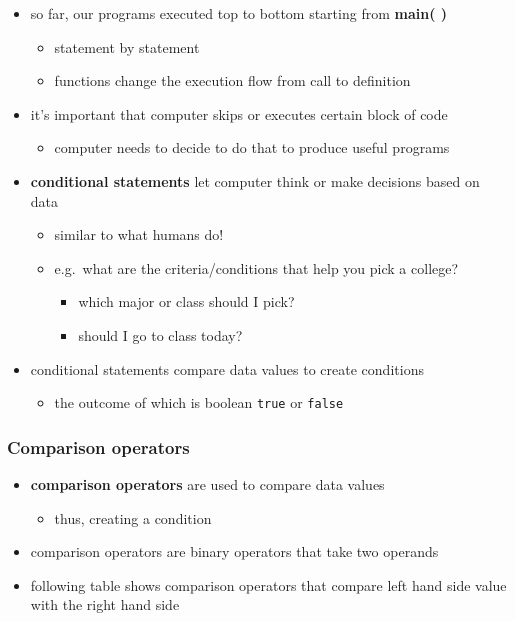\documentclass[11pt]{article}
\providecommand{\tightlist}{%
      \setlength{\itemsep}{0pt}\setlength{\parskip}{0pt}}
\begin{document}
\begin{itemize}
\tightlist
\item
  so far, our programs executed top to bottom starting from
  \textbf{main( )}

  \begin{itemize}
  \tightlist
  \item
    statement by statement
  \item
    functions change the execution flow from call to definition
  \end{itemize}
\item
  it's important that computer skips or executes certain block of code

  \begin{itemize}
  \tightlist
  \item
    computer needs to decide to do that to produce useful programs
  \end{itemize}
\item
  \textbf{conditional statements} let computer think or make decisions
  based on data

  \begin{itemize}
  \tightlist
  \item
    similar to what humans do!
  \item
    e.g.~what are the criteria/conditions that help you pick a college?

    \begin{itemize}
    \tightlist
    \item
      which major or class should I pick?
    \item
      should I go to class today?
    \end{itemize}
  \end{itemize}
\item
  conditional statements compare data values to create conditions

  \begin{itemize}
  \tightlist
  \item
    the outcome of which is boolean \texttt{true} or \texttt{false}
  \end{itemize}
\end{itemize}

\hypertarget{comparison-operators}{%
\subsubsection{Comparison operators}\label{comparison-operators}}

\begin{itemize}
\tightlist
\item
  \textbf{comparison operators} are used to compare data values

  \begin{itemize}
  \tightlist
  \item
    thus, creating a condition
  \end{itemize}
\item
  comparison operators are binary operators that take two operands
\item
  following table shows comparison operators that compare left hand side
  value with the right hand side
\end{itemize}
\end{document}
